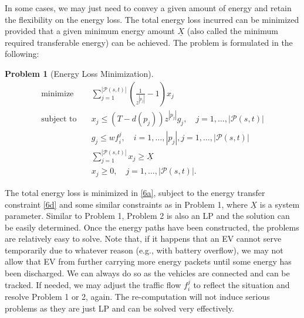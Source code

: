 \documentclass[journal]{IEEEtran}
\newtheorem{problem}{Problem}
\begin{document}
In some cases, we may just need to convey a given amount of energy and retain the flexibility on the energy loss. The total energy loss incurred can be minimized provided that a given minimum energy amount $\underline{X}$ (also called the minimum required transferable energy) can be achieved. The problem is formulated in the following:
\begin{problem}[Energy Loss Minimization]
\label{minopt}
\begin{subequations}
\label{minopteq}
\begin{align}
\text{minimize}\quad 	& \sum_{j=1}^{|\mathcal{P}(s,t)|}{(\frac{1}{z^{|p_j|}}-1)   x_j} \label{6a}\\
\text{subject to}\quad 
& x_j\leq (T-d(p_j))z^{|p_j|}g_j, \quad j=1,\ldots, |\mathcal{P}(s,t)| \label{6b}\\
& g_j \leq w f_i^j, \quad i=1,\ldots,|p_j|, j=1,\ldots, |\mathcal{P}(s,t)| \label{6c}\\
& \sum_{j=1}^{|\mathcal{P}(s,t)|}{x_j} \geq \underline{X}  \label{6d}\\
& x_j\geq 0, \quad j=1,\ldots, |\mathcal{P}(s,t)| \label{6e}.
\end{align}
\end{subequations}
\end{problem}
The total energy loss is minimized in \eqref{6a}, subject to the energy transfer constraint \eqref{6d} and some similar constraints as in Problem 1, where $\underline{X}$ is a system parameter. Similar to Problem 1, Problem 2 is also an LP and the solution can be easily determined. Once the energy paths have been constructed, the problems are relatively easy to solve. Note that, if it happens that an EV cannot serve temporarily due to whatever reason (e.g., with battery overflow), we may not allow that EV from further carrying more energy packets until some energy has been discharged. We can always do so as the vehicles are connected and can be tracked. If needed, we may adjust the traffic flow $f_i^j$ to reflect the situation and resolve Problem 1 or 2, again. The re-computation will not induce serious problems as they are just LP and can be solved very effectively.
\end{document}
